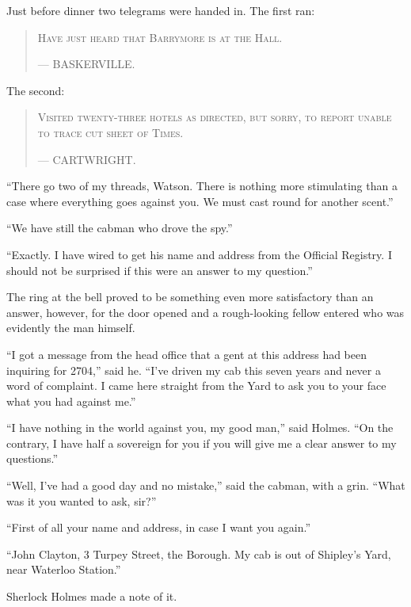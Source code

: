 \documentclass[paper=5.5in:8.5in,BCOR=7mm,twoside,DIV=calc,12pt,usegeometry,openany,chapterprefix,endperiod,headings=big]{scrbook} %
\begin{document}
Just before dinner two telegrams were handed in. The first ran:
\begin{samepage}
\blockquote{
\textsc{Have just heard that Barrymore is at the Hall.}
\begin{flushright}
--- {\small\scshape BASKERVILLE.}
\end{flushright} 
}
\end{samepage}

The second:
\begin{samepage}
\blockquote{
\textsc{Visited twenty-three hotels as directed, but sorry, to report unable to trace cut sheet of Times.}
\begin{flushright}
--- {\small\scshape CARTWRIGHT.}
\end{flushright}
}
\end{samepage}

\enquote{There go two of my threads, Watson. There is nothing more stimulating than a case where everything goes against you. We must cast round for another scent.}

\enquote{We have still the cabman who drove the spy.}

\enquote{Exactly. I have wired to get his name and address from the Official Registry. I should not be surprised if this were an answer to my question.}

The ring at the bell proved to be something even more satisfactory than an answer, however, for the door opened and a rough-looking fellow entered who was evidently the man himself.

\enquote{I got a message from the head office that a gent at this address had been inquiring for 2704,} said he. \enquote{I've driven my cab this seven years and never a word of complaint. I came here straight from the Yard to ask you to your face what you had against me.}

\enquote{I have nothing in the world against you, my good man,} said Holmes. \enquote{On the contrary, I have half a sovereign for you if you will give me a clear answer to my questions.}

\enquote{Well, I've had a good day and no mistake,} said the cabman, with a grin. \enquote{What was it you wanted to ask, sir?}

\enquote{First of all your name and address, in case I want you again.}

\enquote{John Clayton, 3 Turpey Street, the Borough. My cab is out of Shipley's Yard, near Waterloo Station.}

Sherlock Holmes made a note of it.
\end{document}
